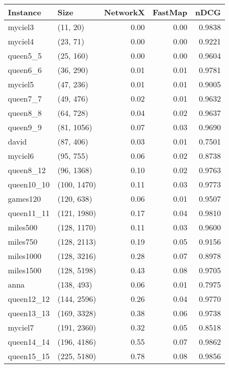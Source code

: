 \begin{tabular}{llrrr}
\toprule
  Instance &         Size &  NetworkX &  FastMap &   nDCG \\
\midrule
   myciel3 &     (11, 20) &      0.00 &     0.00 & 0.9838 \\
   myciel4 &     (23, 71) &      0.00 &     0.00 & 0.9221 \\
  queen5\_5 &    (25, 160) &      0.00 &     0.00 & 0.9604 \\
  queen6\_6 &    (36, 290) &      0.01 &     0.01 & 0.9781 \\
   myciel5 &    (47, 236) &      0.01 &     0.01 & 0.9005 \\
  queen7\_7 &    (49, 476) &      0.02 &     0.01 & 0.9632 \\
  queen8\_8 &    (64, 728) &      0.04 &     0.02 & 0.9637 \\
  queen9\_9 &   (81, 1056) &      0.07 &     0.03 & 0.9690 \\
     david &    (87, 406) &      0.03 &     0.01 & 0.7501 \\
   myciel6 &    (95, 755) &      0.06 &     0.02 & 0.8738 \\
 queen8\_12 &   (96, 1368) &      0.10 &     0.02 & 0.9763 \\
queen10\_10 &  (100, 1470) &      0.11 &     0.03 & 0.9773 \\
  games120 &   (120, 638) &      0.06 &     0.01 & 0.9507 \\
queen11\_11 &  (121, 1980) &      0.17 &     0.04 & 0.9810 \\
  miles500 &  (128, 1170) &      0.11 &     0.03 & 0.9600 \\
  miles750 &  (128, 2113) &      0.19 &     0.05 & 0.9156 \\
 miles1000 &  (128, 3216) &      0.28 &     0.07 & 0.8978 \\
 miles1500 &  (128, 5198) &      0.43 &     0.08 & 0.9705 \\
      anna &   (138, 493) &      0.06 &     0.01 & 0.7975 \\
queen12\_12 &  (144, 2596) &      0.26 &     0.04 & 0.9770 \\
queen13\_13 &  (169, 3328) &      0.38 &     0.06 & 0.9738 \\
   myciel7 &  (191, 2360) &      0.32 &     0.05 & 0.8518 \\
queen14\_14 &  (196, 4186) &      0.55 &     0.07 & 0.9862 \\
queen15\_15 &  (225, 5180) &      0.78 &     0.08 & 0.9856 \\

\end{tabular}
